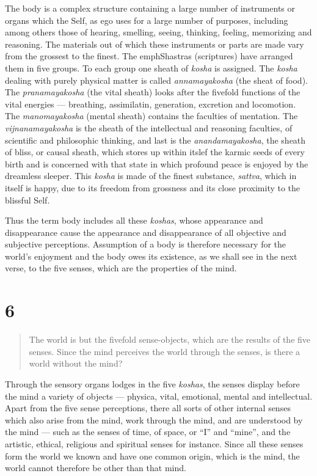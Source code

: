 \documentclass[12pt]{report}
\begin{document}
The body is a complex structure containing a large number of
instruments or organs which the Self, as ego uses for a large number
of purposes, including among others those of hearing, smelling,
seeing, thinking, feeling, memorizing and reasoning. The materials out
of which these instruments or parts are made vary from the grossest to
the finest. The emph{Shastras} (scriptures) have arranged them in five
groups. To each group one sheath of \emph{kosha} is assigned. The
\emph{kosha} dealing with purely physical matter is called
\emph{annamayakosha} (the sheat of food). The \emph{pranamayakosha}
(the vital sheath) looks after the fivefold functions of the vital
energies --- breathing, assimilatin, generation, excretion and
locomotion. The \emph{manomayakosha} (mental sheath) contains the
faculties of mentation. The \emph{vijnanamayakosha} is the sheath of
the intellectual and reasoning faculties, of scientific and
philosophic thinking, and last is the \emph{anandamayakosha}, the
sheath of bliss, or causal sheath, which stores up within itslef the
karmic seeds of every birth and is concerned with that state in which
profound peace is enjoyed by the dreamless sleeper. This \emph{kosha}
is made of the finest substance, \emph{sattva}, which in itself is
happy, due to its freedom from grossness and its close proximity to
the blissful Self.

Thus the term body includes all these \emph{koshas}, whose appearance
and disappearance cause the appearance and disappearance of all
objective and subjective perceptions. Assumption of a body is
therefore necessary for the world's enjoyment and the body owes its
existence, as we shall see in the next verse, to the five senses,
which are the properties of the mind.

\section{6}

\begin{quote}
The world is but the fivefold sense-objects, which are the results of
the five senses. Since the mind perceives the world through the
senses, is there a world without the mind?
\end{quote}


Through the sensory organs lodges in the five \emph{koshas}, the
senses display before the mind a variety of objects --- physica,
vital, emotional, mental and intellectual. Apart from the five sense
perceptions, there all sorts of other internal senses which also arise
from the mind, work through the mind, and are understood by the mind
--- such as the senses of time, of space, or ``I'' and ``mine'', and
the artistic, ethical, religious and spiritual senses for
instance. Since all these senses form the world we known and have one 
common origin, which is the mind, the world cannot therefore be other
than that mind.
\end{document}
